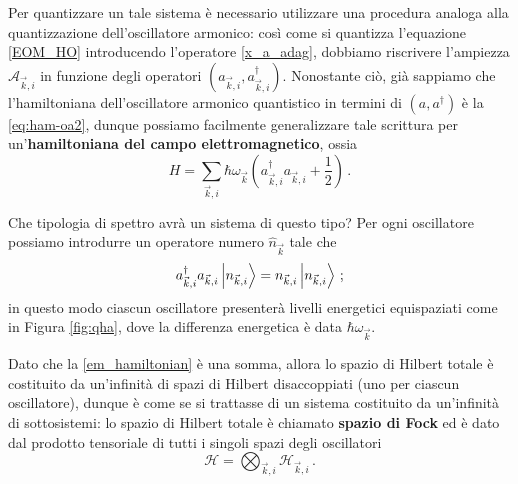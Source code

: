 \noindent Per quantizzare un tale sistema è necessario utilizzare una procedura analoga alla quantizzazione dell'oscillatore armonico: così come si quantizza l'equazione \eqref{EOM_HO} introducendo l'operatore \eqref{x_a_adag}, dobbiamo riscrivere l'ampiezza $\mathcal{A}_{\vec{k},i}$ in funzione degli operatori $(a_{\vec{k},i}, a^\dag_{\vec{k},i})$. Nonostante ciò, già sappiamo che l'hamiltoniana dell'oscillatore armonico quantistico in termini di $(a,a^\dag)$ è la \eqref{eq:ham-oa2}, dunque possiamo facilmente generalizzare tale scrittura per un'\textbf{hamiltoniana del campo elettromagnetico}, ossia
\begin{equation}\label{em_hamiltonian}
    H = \sum_{\vec{k},i} \hbar \omega_{\vec{k}} \left( a^{\dag}_{\vec{k},i} a_{\vec{k},i} + \frac{1}{2} \right) \, .
\end{equation}

\noindent Che tipologia di spettro avrà un sistema di questo tipo? Per ogni oscillatore possiamo introdurre un operatore numero $\hat{n}_{\vec{k}}$ tale che
\begin{equation*}
    a^{\dag}_{\vec{k},i} a_{\vec{k},i} \ket{n_{\vec{k},i}} = n_{\vec{k},i} \ket{n_{\vec{k},i}} \, ;
\end{equation*}
in questo modo ciascun oscillatore presenterà livelli energetici equispaziati come in Figura \ref{fig:qha}, dove la differenza energetica è data $\hbar \omega_{\vec{k}}$.

\noindent Dato che la \eqref{em_hamiltonian} è una somma, allora lo spazio di Hilbert totale è costituito da un'infinità di spazi di Hilbert disaccoppiati (uno per ciascun oscillatore), dunque è come se si trattasse di un sistema costituito da un'infinità di sottosistemi: lo spazio di Hilbert totale è chiamato \textbf{spazio di Fock} ed è dato dal prodotto tensoriale di tutti i singoli spazi degli oscillatori
\begin{equation*}
    \mathcal{H} = \bigotimes_{\vec{k},i} \mathcal{H}_{\vec{k},i} \, .
\end{equation*}

